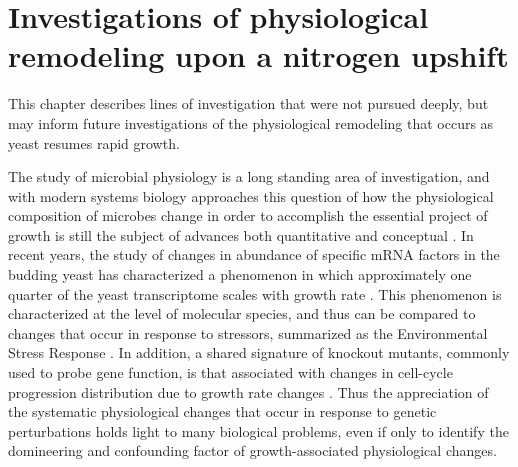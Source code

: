 \chapter{Investigations of physiological remodeling upon a nitrogen 
upshift}
\label{chapter:four}

This chapter describes lines of investigation that were not
pursued deeply, but may inform future investigations of the
physiological remodeling that occurs as yeast resumes rapid
growth.

The study of microbial physiology is a long standing area of
investigation, and with modern systems biology approaches this
question of how the physiological composition of microbes change in
order to accomplish the essential project of growth is still the
subject of advances both quantitative and conceptual 
\parencite{slator1918some,henrici1928morphologic,schaechter1958dependency,kjeldgaard1958transition,wehr1969macromolecular,waldron1977synthesis,carter1978protein,waldron1975effect,kief1981coordinate,scott2010interdependence,erickson2017global,kafri2016cost,metzl2017principles}.
In recent years, the study of changes in abundance of specific mRNA
factors in the budding yeast has characterized a phenomenon in which
approximately one quarter of the yeast transcriptome scales with
growth rate \parencite{brauer2008coordination,airoldi2009predicting}.
This phenomenon is characterized at the level of molecular species,
and thus can be compared to changes that occur in response to
stressors, summarized as the Environmental Stress Response 
\parencite{gasch2000genomic}. 
In addition, a shared signature of knockout mutants, commonly used to
probe gene function, is that associated with changes in cell-cycle
progression distribution due to growth rate changes
\parencite{o2014cell}.
Thus the appreciation of the systematic physiological changes that
occur in response to genetic perturbations holds light to many
biological problems, even if only to identify the domineering and 
confounding factor of growth-associated physiological changes.


